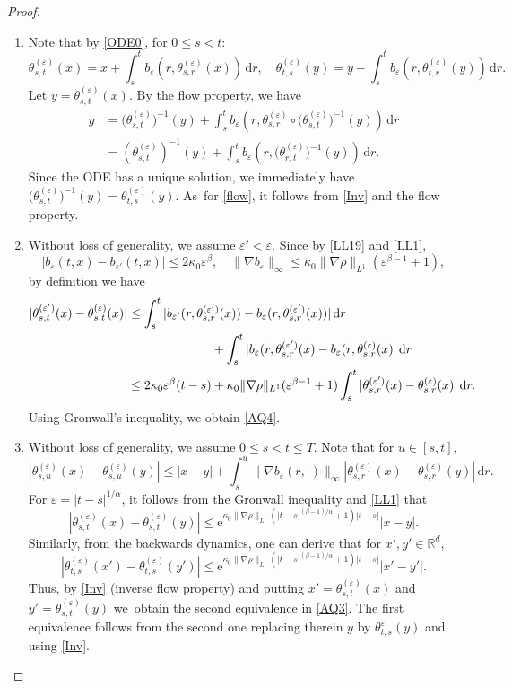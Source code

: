 \documentclass[11pt]{article}
\numberwithin{equation}{section}\providecommand{\asymp}{\mathrel{\sim}}
\theoremstyle{plain}
\theoremstyle{definition}
\newcommand\e{\mathrm{e}}
\let\eps\varepsilon
\newcommand\mR{\mathbb{R}}
\newcommand\1{{\mathbf{1}}}
\newcommand{\dif}{\,\mathrm{d}}
\begin{document}
\begin{proof}
\begin{enumerate}
\item
Note that by \eqref{ODE0}, for $0\le s<t $:
\[
\theta_{s,t}^{(\eps)}(x)=x+\int^t_s{b_{\eps}}(r,\theta_{s,r}^{(\eps)}(x))\dif r,\quad \theta_{t,s}^{(\eps)}(y)=y-\int^t_s{b_{\eps}}(r,\theta_{t,r}^{(\eps)}(y))\dif r.
\]
Let $y=\theta_{s,t}^{(\eps)}(x)$. By the flow property, we have
\begin{align*}
y&=\bigl(\theta_{s,t}^{(\eps)}\bigr)^{-1}(y)+\int^t_s{b_{\eps}}(r,\theta_{s,r}^{(\eps)}\circ\bigl(\theta_{s,t}^{(\eps)}\bigr)^{-1}(y))\dif r\\
&=(\theta_{s,t}^{(\eps)})^{-1}(y)+\int^t_s{b_{\eps}}(r,\bigl(\theta_{r,t}^{(\eps)}\bigr)^{-1}(y))\dif r.
\end{align*}
Since the ODE has a unique solution, we immediately have $\bigl(\theta_{s,t}^{(\eps)}\bigr)^{-1}(y)=\theta_{t,s}^{(\eps)}(y)$. As~for \eqref{flow}, it follows from \eqref{Inv}
and the flow property.

\item
Without loss of generality, we assume $\eps'<\eps$. Since by \eqref{LL19} and \eqref{LL1},
\begin{equation}\label{LL2}
|b_\eps(t,x)-b_{\eps'}(t,x)|\leq 2\kappa_0\eps^\beta,\quad \|\nabla b_\eps\|_\infty\leq \kappa_0\|\nabla\rho\|_{L^1}(\eps^{\beta-1}+1),
\end{equation}
by definition we have
\begin{align*}
|\theta^{(\eps')}_{s,t}(x)-\theta^{(\eps)}_{s,t}(x)|
&\leq\int^t_s |b_{\eps'}(r,\theta^{(\eps')}_{s,r}(x))-b_{\eps}(r,\theta^{(\eps')}_{s,r}(x))|\dif r
\\&\hspace*{2.35cm}+\int^t_s |b_{\eps}(r,\theta^{(\eps')}_{s,r}(x)-b_{\eps}(r,\theta^{(\eps)}_{s,r}(x)|\dif r
\\&\leq 2\kappa_0\eps^\beta(t-s)+\kappa_0\|\nabla\rho\|_{L^1}(\eps^{\beta-1}+1)\int^t_s |\theta^{(\eps')}_{s,r}(x)-\theta^{(\eps)}_{s,r}(x)|\dif r.
\end{align*}
Using Gronwall's inequality, we obtain \eqref{AQ4}.

\item
Without loss of generality, we assume $0\leq s<t\leq T$.
Note that for $u\in[s,t]$,
\[
|\theta^{(\eps)}_{s,u}(x)-\theta^{(\eps)}_{s,u}(y)|\leq |x-y|+\int^u_s\|\nabla b_\eps(r,\cdot)\|_\infty|\theta^{(\eps)}_{s,r}(x)-\theta^{(\eps)}_{s,r}(y)|\dif r.
\]
For $\eps=|t-s|^{1/\alpha}$, it follows from the Gronwall inequality and \eqref{LL1} that
\[
|\theta^{(\eps)}_{s,t}(x)-\theta^{(\eps)}_{s,t}(y)|\leq \e^{\kappa_0\|\nabla\rho\|_{L^1}(|t-s|^{(\beta-1)/\alpha}+1)|t-s|}|x-y|.
\]
Similarly, from the backwards dynamics, one can derive that for {$x',y'\in \mR^d $,
\[
|\theta^{(\eps)}_{t,s}({x'})-\theta^{(\eps)}_{t,s}({y'})|\leq \e^{\kappa_0\|\nabla\rho\|_{L^1}(|t-s|^{(\beta-1)/\alpha}+1)|t-s|}|{x'-y'}|.
\]
Thus, by \eqref{Inv} {(inverse flow property)} and putting $x'=\theta^{(\eps)}_{{s,t}}(x)$ and $y'=\theta^{(\eps)}_{{s,t}}(y)$ we~obtain the second equivalence in \eqref{AQ3}.
The first equivalence follows from the second one replacing therein $y $ by $\theta_{t,s}^{\eps}(y) $ and using \eqref{Inv}}.\qedhere
\end{enumerate}
\end{proof}
\end{document}
